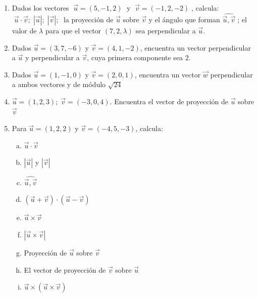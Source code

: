 \begin{enumerate}
\vspace{2mm}

\item Dados los vectores $\;\vec u=(5,-1,2)\;$ y $\;\vec v=(-1,2,-2)\;$, calcula: $\; \vec u \cdot \vec v;\; |\vec u|;\; |\vec v|;\;$ la proyección de $\vec u$ sobre $\vec v$ y el ángulo que forman $\widehat{\vec u, \vec v }\;$; el valor de $\lambda$ para que el vector $(7,2,\lambda)$ sea perpendicular a $\vec u$. 

\vspace{2mm}

\item Dados $\vec u=(3,7,-6)$ y $\vec v =(4,1,-2)$, encuentra un vector perpendicular a $\vec u$ y perpendicular a $\vec v$, cuya primera componente sea $2$.

\vspace{2mm}

\item Dados $\vec u=(1,-1,0)$ y $\vec v=(2,0,1)$, encuentra un vector $\vec w$ perpendicular a ambos vectores y de módulo $\sqrt{24}$

\vspace{2mm}

\item $\vec u=(1,2,3); \; \vec v=(-3,0,4)$. Encuentra el vector de proyección de $\vec u$ sobre $\vec v$


\item  Para $\vec u=(1,2,2)$ y $\vec v=(-4,5,-3)$, calcula:
\begin{multicols}{2}
\begin{enumerate}[a) ]
\item $\vec u \cdot \vec v$
\item $|\vec u|$ y $|\vec v|$
\item $\widehat{\vec u, \vec v}$
\item $(\vec u + \vec v)\cdot(\vec u-\vec v)$
\item $\vec u \times \vec v$
\item $|\vec u \times \vec v|$
\item Proyección de $\vec u$ sobre $\vec v$
\item El vector de proyección de $\vec v$ sobre $\vec u$
\item $\vec u \times (\vec u \times \vec v)$
\end{enumerate}
\end{multicols}


\end{enumerate}
